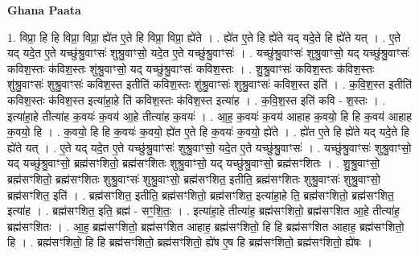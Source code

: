 \documentclass[17pt]{extarticle}
\begin{document}
\textbf{Ghana Paata } \newline

1. विप्रा॒ हि हि विप्रा॒ विप्रा॒ ह्ये॑त ए॒ते हि विप्रा॒ विप्रा॒ ह्ये॑ते । . ह्ये॑त ए॒ते हि ह्ये॑ते यद् यदे॒ते हि ह्ये॑ते यत् । . ए॒ते यद् यदे॒त ए॒ते यच्छु॑श्रु॒वाꣳसः॑ शुश्रु॒वाꣳसो॒ यदे॒त ए॒ते यच्छु॑श्रु॒वाꣳसः॑ । . यच्छु॑श्रु॒वाꣳसः॑ शुश्रु॒वाꣳसो॒ यद् यच्छु॑श्रु॒वाꣳसः॑ कविश॒स्तः क॑विश॒स्तः शु॑श्रु॒वाꣳसो॒ यद् यच्छु॑श्रु॒वाꣳसः॑ कविश॒स्तः । . शु॒श्रु॒वाꣳसः॑ कविश॒स्तः क॑विश॒स्तः शु॑श्रु॒वाꣳसः॑ शुश्रु॒वाꣳसः॑ कविश॒स्त इतीति॑ कविश॒स्तः शु॑श्रु॒वाꣳसः॑ शुश्रु॒वाꣳसः॑ कविश॒स्त इति॑ । . क॒वि॒श॒स्त इतीति॑ कविश॒स्तः क॑विश॒स्त इत्या॑हा॒हे ति॑ कविश॒स्तः क॑विश॒स्त इत्या॑ह । . क॒वि॒श॒स्त इति॑ कवि - श॒स्तः । . इत्या॑हा॒हे तीत्या॑ह क॒वयः॑ क॒वय॑ आ॒हे तीत्या॑ह क॒वयः॑ । . आ॒ह॒ क॒वयः॑ क॒वय॑ आहाह क॒वयो॒ हि हि क॒वय॑ आहाह क॒वयो॒ हि । . क॒वयो॒ हि हि क॒वयः॑ क॒वयो॒ ह्ये॑त ए॒ते हि क॒वयः॑ क॒वयो॒ ह्ये॑ते । . ह्ये॑त ए॒ते हि ह्ये॑ते यद् यदे॒ते हि ह्ये॑ते यत् । . ए॒ते यद् यदे॒त ए॒ते यच्छु॑श्रु॒वाꣳसः॑ शुश्रु॒वाꣳसो॒ यदे॒त ए॒ते यच्छु॑श्रु॒वाꣳसः॑ । . यच्छु॑श्रु॒वाꣳसः॑ शुश्रु॒वाꣳसो॒ यद् यच्छु॑श्रु॒वाꣳसो॒ ब्रह्म॑सꣳशितो॒ ब्रह्म॑सꣳशितः शुश्रु॒वाꣳसो॒ यद् यच्छु॑श्रु॒वाꣳसो॒ ब्रह्म॑सꣳशितः । . शु॒श्रु॒वाꣳसो॒ ब्रह्म॑सꣳशितो॒ ब्रह्म॑सꣳशितः शुश्रु॒वाꣳसः॑ शुश्रु॒वाꣳसो॒ ब्रह्म॑सꣳशित॒ इतीति॒ ब्रह्म॑सꣳशितः शुश्रु॒वाꣳसः॑ शुश्रु॒वाꣳसो॒ ब्रह्म॑सꣳशित॒ इति॑ । . ब्रह्म॑सꣳशित॒ इतीति॒ ब्रह्म॑सꣳशितो॒ ब्रह्म॑सꣳशित॒ इत्या॑हा॒हे ति॒ ब्रह्म॑सꣳशितो॒ ब्रह्म॑सꣳशित॒ इत्या॑ह । . ब्रह्म॑सꣳशित॒ इति॒ ब्रह्म॑ - सꣳ॒॒शि॒तः॒ । . इत्या॑हा॒हे तीत्या॑ह॒ ब्रह्म॑सꣳशितो॒ ब्रह्म॑सꣳशित आ॒हे तीत्या॑ह॒ ब्रह्म॑सꣳशितः । . आ॒ह॒ ब्रह्म॑सꣳशितो॒ ब्रह्म॑सꣳशित आहाह॒ ब्रह्म॑सꣳशितो॒ हि हि ब्रह्म॑सꣳशित आहाह॒ ब्रह्म॑सꣳशितो॒ हि । . ब्रह्म॑सꣳशितो॒ हि हि ब्रह्म॑सꣳशितो॒ ब्रह्म॑सꣳशितो॒ ह्ये॑ष ए॒ष हि ब्रह्म॑सꣳशितो॒ ब्रह्म॑सꣳशितो॒ ह्ये॑षः । \newline
\end{document}
